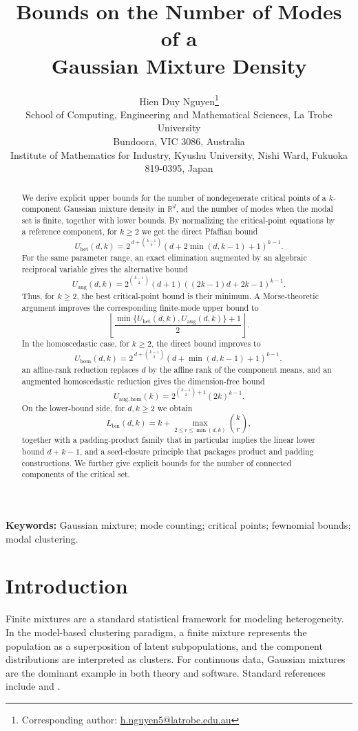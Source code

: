 \documentclass[11pt]{article}
\title{Bounds on the Number of Modes of a\\ Gaussian Mixture Density}
\author{Hien Duy Nguyen\thanks{Corresponding author: \href{mailto:h.nguyen5@latrobe.edu.au}{h.nguyen5@latrobe.edu.au}}\\[0.5ex]
\small School of Computing, Engineering and Mathematical Sciences, La Trobe University\\
\small Bundoora, VIC 3086, Australia\\
\small Institute of Mathematics for Industry, Kyushu University, Nishi Ward, Fukuoka 819-0395, Japan}
\date{}
\theoremstyle{plain}
\theoremstyle{definition}
\theoremstyle{remark}
\numberwithin{equation}{section}
\newcommand{\R}{\mathbb{R}}
\newcommand{\keywords}[1]{\par\bigskip\noindent\textbf{Keywords:} #1\par}
\begin{document}
\maketitle

\begin{abstract}
We derive explicit upper bounds for the number of nondegenerate critical points of a $k$-component Gaussian mixture density in $\R^d$, and the number of modes when the modal set is finite, together with lower bounds. By normalizing the critical-point equations by a reference component, for $k\ge2$ we get the direct Pfaffian bound
\[
U_{\mathrm{het}}(d,k)=2^{\,d+\binom{k-1}{2}}\left(d+2\min(d,k-1)+1\right)^{k-1}.
\]
For the same parameter range, an exact elimination augmented by an algebraic reciprocal variable gives the alternative bound
\[
U_{\mathrm{aug}}(d,k)=
2^{\binom{k-1}{2}}(d+1)\left((2k-1)d+2k-1\right)^{k-1}.
\]
Thus, for $k\ge2$, the best critical-point bound is their minimum. A Morse-theoretic argument improves the corresponding finite-mode upper bound to
\[
\left\lfloor \frac{\min\{U_{\mathrm{het}}(d,k),U_{\mathrm{aug}}(d,k)\}+1}{2}\right\rfloor.
\]
In the homoscedastic case, for $k\ge2$, the direct bound improves to
\[
U_{\mathrm{hom}}(d,k)=2^{\,d+\binom{k-1}{2}}\left(d+\min(d,k-1)+1\right)^{k-1},
\]
an affine-rank reduction replaces $d$ by the affine rank of the component means, and an augmented homoscedastic reduction gives the dimension-free bound
\[
U_{\mathrm{aug,hom}}(k)=2^{\binom{k-1}{2}+1}(2k)^{k-1}.
\]
On the lower-bound side, for $d,k\ge 2$ we obtain
\[
L_{\mathrm{bin}}(d,k)=k+\max_{2\le r\le \min(d,k)}\binom{k}{r},
\]
together with a padding-product family that in particular implies the linear lower bound $d+k-1$, and a seed-closure principle that packages product and padding constructions. We further give explicit bounds for the number of connected components of the critical set.
\end{abstract}

\keywords{Gaussian mixture; mode counting; critical points; fewnomial bounds; modal clustering.}

\section{Introduction}\label{sec:intro}

Finite mixtures are a standard statistical framework for modeling heterogeneity. In the model-based clustering paradigm, a finite mixture represents the population as a superposition of latent subpopulations, and the component distributions are interpreted as clusters. For continuous data, Gaussian mixtures are the dominant example in both theory and software. Standard references include \citet{McLachlanPeel2000} and \citet{ScruccaFraleyMurphyRaftery2023}.
\end{document}
